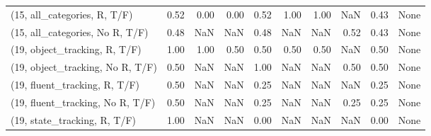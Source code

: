\begin{table*}[h!]
\begin{adjustbox}{width=2\columnwidth,center}
\begin{tabular}{lrrr|rrr|rrr}
(15, all\_categories, R, T/F)          &                      0.52 &                  0.00 &                      0.00 &                          0.52 &                      1.00 &                          1.00 &                                    NaN &                               0.43 &                                  None \\
(15, all\_categories, No R, T/F)       &                      0.48 &                   NaN &                       NaN &                          0.48 &                       NaN &                           NaN &                                   0.52 &                               0.43 &                                  None \\



\midrule
(19, object\_tracking, R, T/F)         &                      1.00 &                  1.00 &                      0.50 &                          0.50 &                      0.50 &                          0.50 &                                    NaN &                               0.50 &                                  None \\
(19, object\_tracking, No R, T/F)      &                      0.50 &                   NaN &                       NaN &                          1.00 &                       NaN &                           NaN &                                   0.50 &                               0.50 &                                  None \\
(19, fluent\_tracking, R, T/F)         &                      0.50 &                   NaN &                       NaN &                          0.25 &                       NaN &                           NaN &                                    NaN &                               0.25 &                                  None \\
(19, fluent\_tracking, No R, T/F)      &                      0.50 &                   NaN &                       NaN &                          0.25 &                       NaN &                           NaN &                                   0.25 &                               0.25 &                                  None \\
(19, state\_tracking, R, T/F)          &                      1.00 &                   NaN &                       NaN &                          0.00 &                       NaN &                           NaN &                                    NaN &                               0.00 &                                  None \\

\end{tabular}
\end{adjustbox}
\end{table*}

